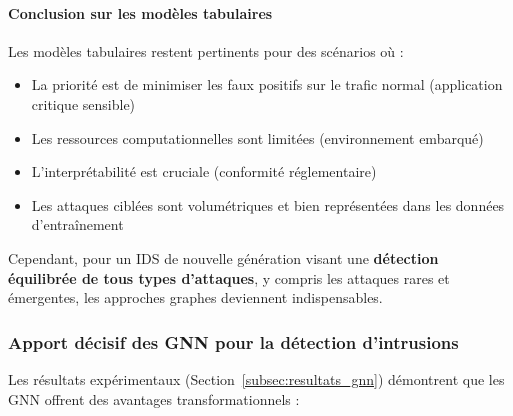 ﻿\documentclass[11pt,a4paper]{article}
\begin{document}
\paragraph{Conclusion sur les modèles tabulaires}

Les modèles tabulaires restent pertinents pour des scénarios où :
\begin{itemize}
    \item La priorité est de minimiser les faux positifs sur le trafic normal (application critique sensible)
    \item Les ressources computationnelles sont limitées (environnement embarqué)
    \item L'interprétabilité est cruciale (conformité réglementaire)
    \item Les attaques ciblées sont volumétriques et bien représentées dans les données d'entraînement
\end{itemize}

Cependant, pour un IDS de nouvelle génération visant une \textbf{détection équilibrée de tous types d'attaques}, y compris les attaques rares et émergentes, les approches graphes deviennent indispensables.

\subsubsection{Apport décisif des GNN pour la détection d'intrusions}

Les résultats expérimentaux (Section~\ref{subsec:resultats_gnn}) démontrent que les GNN offrent des avantages transformationnels :
\end{document}
